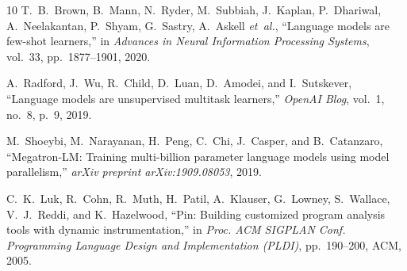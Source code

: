 \documentclass[conference]{IEEEtran}
\begin{document}
\begin{thebibliography}{10}
T.~B.~Brown, B.~Mann, N.~Ryder, M.~Subbiah, J.~Kaplan, P.~Dhariwal,
A.~Neelakantan, P.~Shyam, G.~Sastry, A.~Askell \emph{et~al.},
``Language models are few-shot learners,''
in \emph{Advances in Neural Information Processing Systems},
vol.~33, pp.~1877--1901, 2020.

A.~Radford, J.~Wu, R.~Child, D.~Luan, D.~Amodei, and I.~Sutskever,
``Language models are unsupervised multitask learners,''
\emph{OpenAI Blog}, vol.~1, no.~8, p.~9, 2019.

M.~Shoeybi, M.~Narayanan, H.~Peng, C.~Chi, J.~Casper, and
B.~Catanzaro,
``Megatron-LM: Training multi-billion parameter language models using
model parallelism,''
\emph{arXiv preprint arXiv:1909.08053}, 2019.

C.~K.~Luk, R.~Cohn, R.~Muth, H.~Patil, A.~Klauser, G.~Lowney,
S.~Wallace, V.~J.~Reddi, and K.~Hazelwood,
``Pin: Building customized program analysis tools with dynamic
instrumentation,''
in \emph{Proc. ACM SIGPLAN Conf. Programming Language Design and
Implementation (PLDI)}, pp.~190--200, ACM, 2005.

\end{thebibliography}
\end{document}
